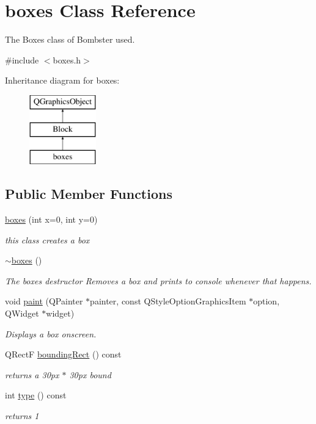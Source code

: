 \hypertarget{classboxes}{\section{boxes Class Reference}
\label{classboxes}
}


The Boxes class of Bombster used.  




{\ttfamily \#include $<$boxes.\-h$>$}

Inheritance diagram for boxes\-:\begin{figure}[H]
\begin{center}
\leavevmode
\includegraphics[height=3.000000cm]{classboxes}
\end{center}
\end{figure}
\subsection*{Public Member Functions}
\begin{DoxyCompactItemize}
\item 
\hyperlink{classboxes_a093427b27f4b84a803544cb738dc12e6}{boxes} (int x=0, int y=0)
\begin{DoxyCompactList}\small\item\em this class creates a box \end{DoxyCompactList}\item 
\hyperlink{classboxes_a7d70921b4fe775ad313ac80d6da55222}{$\sim$boxes} ()
\begin{DoxyCompactList}\small\item\em The boxes destructor Removes a box and prints to console whenever that happens. \end{DoxyCompactList}\item 
void \hyperlink{classboxes_aa07b0460f8be5da676c4369331061fa6}{paint} (Q\-Painter $\ast$painter, const Q\-Style\-Option\-Graphics\-Item $\ast$option, Q\-Widget $\ast$widget)
\begin{DoxyCompactList}\small\item\em Displays a box onscreen. \end{DoxyCompactList}\item 
Q\-Rect\-F \hyperlink{classboxes_a4855400f92db9ebe776a79c79bac1d50}{bounding\-Rect} () const 
\begin{DoxyCompactList}\small\item\em returns a 30px $\ast$ 30px bound \end{DoxyCompactList}\item 
int \hyperlink{classboxes_abc3e99501e6d9108c0fa115214b0e14e}{type} () const 
\begin{DoxyCompactList}\small\item\em returns 1 \end{DoxyCompactList}\end{DoxyCompactItemize}
